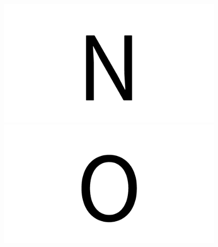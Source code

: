 \documentclass{article}
\begin{document}
\begin{figure}[H]
  \includegraphics[width=\linewidth]{u_N}
\endminipage\hfill
{}
  \includegraphics[width=\linewidth]{u_O}
\endminipage\hfill
\end{figure}
\end{document}
